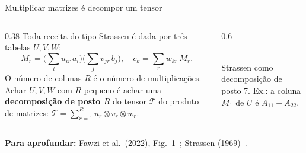 \documentclass[aspectratio=169,xcolor=table]{beamer}
\newcommand{\gradecoef}[4]{%
  \begin{scope}[shift={(#1,0)}]
    \foreach \lin [count=\i] in {#3} {
      \foreach \v [count=\j] in \lin {
        \ifnum\v=1  \fill[blue!65]  (\j*0.32,-\i*0.32) rectangle ++(0.32,0.32);\fi
        \ifnum\v=-1 \fill[red!65]   (\j*0.32,-\i*0.32) rectangle ++(0.32,0.32);\fi
        \draw[gray!60] (\j*0.32,-\i*0.32) rectangle ++(0.32,0.32);
      }
    }
    \foreach \r [count=\i] in {#4}
      \node[font=\tiny, anchor=east] at (0.3,-\i*0.32+0.16) {$\r$};
    \foreach \j in {1,...,7}
      \node[font=\tiny] at (\j*0.32+0.16, 0.18) {$M_{\j}$};
    \node[font=\scriptsize\bfseries] at (1.28,-1.65) {#2};
  \end{scope}%
}
\newcommand{\fonte}[1]{%
  \vfill
  {\tiny\color{gray!55!black}\textbf{Para aprofundar:} #1\par}%
}
\begin{document}
\begin{frame}{Multiplicar matrizes é decompor um tensor}
  \begin{columns}[c]
    \begin{column}{0.38\textwidth}
      \scriptsize
      Toda receita do tipo Strassen é dada por três tabelas $U,V,W$:
      \[
        M_r = \Big(\sum_i u_{ir}\,a_i\Big)\Big(\sum_j v_{jr}\,b_j\Big),\quad
        c_k = \sum_r w_{kr}\,M_r.
      \]
      O número de colunas $R$ é o número de multiplicações. Achar $U,V,W$ com $R$ pequeno é
      achar uma \textbf{decomposição de posto $R$} do tensor $\mathcal T$ do produto
      de matrizes: $\mathcal T = \sum_{r=1}^{R} u_r\otimes v_r\otimes w_r$.
    \end{column}
    \begin{column}{0.6\textwidth}
      \centering
      \\[2pt]
      {\tiny Strassen como decomposição de posto 7. Ex.: a coluna $M_1$ de $U$ é
      $A_{11}+A_{22}$.}
    \end{column}
  \end{columns}
  \fonte{Fawzi et al.\ (2022), Fig.~1~\cite{fawzi2022discovering};
    Strassen (1969)~\cite{strassen1969gaussian}.}
\end{frame}
\end{document}
